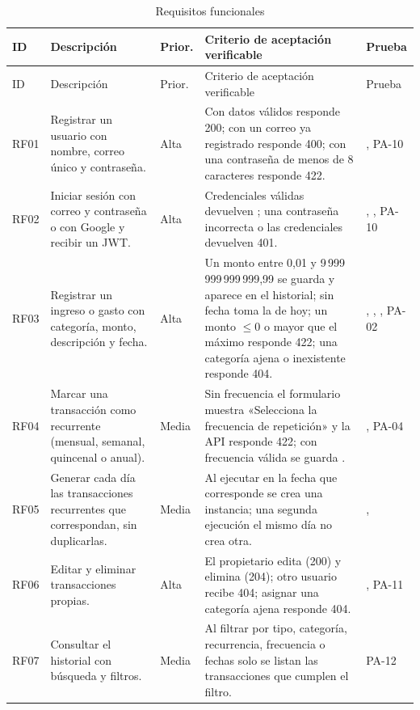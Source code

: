 {\footnotesize\renewcommand{\arraystretch}{1.15}
\begin{longtable}{L{1cm} L{4.2cm} L{1.1cm} L{5cm} L{2.6cm}}
\caption{Requisitos funcionales}\label{tab:rf}\\
\toprule
ID & Descripción & Prior. & Criterio de aceptación verificable & Prueba \\
\midrule
\endfirsthead
\toprule
ID & Descripción & Prior. & Criterio de aceptación verificable & Prueba \\
\midrule
\endhead
\bottomrule
\endfoot
RF01 & Registrar un usuario con nombre, correo único y contraseña. & Alta & Con datos válidos responde 200; con un correo ya registrado responde 400; con una contraseña de menos de 8 caracteres responde 422. & , PA-10 \\
RF02 & Iniciar sesión con correo y contraseña o con Google y recibir un JWT. & Alta & Credenciales válidas devuelven ; una contraseña incorrecta o las credenciales  devuelven 401. & , , PA-10 \\
RF03 & Registrar un ingreso o gasto con categoría, monto, descripción y fecha. & Alta & Un monto entre 0,01 y 9\,999\,999\,999\,999,99 se guarda y aparece en el historial; sin fecha toma la de hoy; un monto $\leq 0$ o mayor que el máximo responde 422; una categoría ajena o inexistente responde 404. & , , , PA-02 \\
RF04 & Marcar una transacción como recurrente (mensual, semanal, quincenal o anual). & Media & Sin frecuencia el formulario muestra «Selecciona la frecuencia de repetición» y la API responde 422; con frecuencia válida se guarda . & , PA-04 \\
RF05 & Generar cada día las transacciones recurrentes que correspondan, sin duplicarlas. & Media & Al ejecutar  en la fecha que corresponde se crea una instancia; una segunda ejecución el mismo día no crea otra. & ,  \\
RF06 & Editar y eliminar transacciones propias. & Alta & El propietario edita (200) y elimina (204); otro usuario recibe 404; asignar una categoría ajena responde 404. & , PA-11 \\
RF07 & Consultar el historial con búsqueda y filtros. & Media & Al filtrar por tipo, categoría, recurrencia, frecuencia o fechas solo se listan las transacciones que cumplen el filtro. & PA-12 \\

\end{longtable}}
